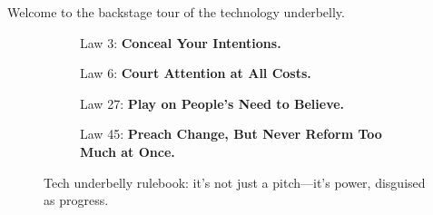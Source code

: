 Welcome to the backstage tour of the technology underbelly.

\begin{figure}[H]
  \centering

  \begin{subfigure}[t]{0.45\textwidth}
  \centering
  \caption*{Law 3: \textbf{Conceal Your Intentions.}}
  \end{subfigure}
  \hfill
  \begin{subfigure}[t]{0.45\textwidth}
  \centering
  \caption*{Law 6: \textbf{Court Attention at All Costs.}}
  \end{subfigure}

  \vspace{1em}

  \begin{subfigure}[t]{0.45\textwidth}
  \centering
  \caption*{Law 27: \textbf{Play on People’s Need to Believe.}}
  \end{subfigure}
  \hfill
  \begin{subfigure}[t]{0.45\textwidth}
  \centering
  \caption*{Law 45: \textbf{Preach Change, But Never Reform Too Much at Once.}}
  \end{subfigure}

  \caption*{Tech underbelly rulebook: it's not just a pitch—it's power, disguised as progress.}
\end{figure}






